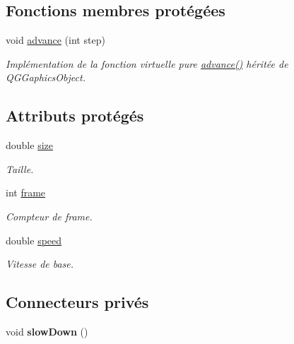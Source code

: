 \subsection*{Fonctions membres protégées}
\begin{DoxyCompactItemize}
\item 
void \hyperlink{classBug_a8e0ea03e85c9324a13328da60e5c52ee}{advance} (int step)
\begin{DoxyCompactList}\small\item\em Implémentation de la fonction virtuelle pure \hyperlink{classBug_a8e0ea03e85c9324a13328da60e5c52ee}{advance()} héritée de QGGaphicsObject. \end{DoxyCompactList}\end{DoxyCompactItemize}
\subsection*{Attributs protégés}
\begin{DoxyCompactItemize}
\item 
double \hyperlink{classBug_a27a0f0b84d15525e409955509e6e3c42}{size}
\begin{DoxyCompactList}\small\item\em Taille. \end{DoxyCompactList}\item 
int \hyperlink{classBug_ad7e3597cf049f1051be94fcaf2fd3598}{frame}
\begin{DoxyCompactList}\small\item\em Compteur de frame. \end{DoxyCompactList}\item 
double \hyperlink{classBug_a13b95fbf23748ea853b01bfd0b0e7fc8}{speed}
\begin{DoxyCompactList}\small\item\em Vitesse de base. \end{DoxyCompactList}\end{DoxyCompactItemize}
\subsection*{Connecteurs privés}
\begin{DoxyCompactItemize}
\item 
\hypertarget{classAnt_a1261f3d930faf4c98f06e173203a3d72}{
void {\bfseries slowDown} ()}
\label{classAnt_a1261f3d930faf4c98f06e173203a3d72}

\end{DoxyCompactItemize}
